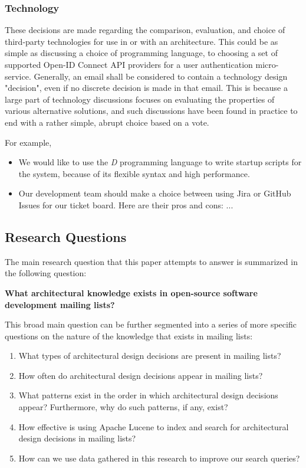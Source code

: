 \documentclass[a4paper, 12pt]{article}
\begin{document}
		\subsubsection{\textbf{Technology}}
			These decisions are made regarding the comparison, evaluation, and choice of third-party technologies for use in or with an architecture. This could be as simple as discussing a choice of programming language, to choosing a set of supported Open-ID Connect API providers for a user authentication micro-service. Generally, an email shall be considered to contain a technology design "decision", even if no discrete decision is made in that email. This is because a large part of technology discussions focuses on evaluating the properties of various alternative solutions, and such discussions have been found in practice to end with a rather simple, abrupt choice based on a vote.
			
			For example,
			\begin{itemize}
				\item We would like to use the \textit{D} programming language to write startup scripts for the system, because of its flexible syntax and high performance\cite{bright}.
				\item Our development team should make a choice between using Jira or GitHub Issues for our ticket board. Here are their pros and cons: ...
			\end{itemize}
		
	\newpage
	\subsection{Research Questions}
		\label{sec:research-questions}
		The main research question that this paper attempts to answer is summarized in the following question:
		
		\large \textbf{What architectural knowledge exists in open-source software development mailing lists?}
		\normalsize
		
		This broad main question can be further segmented into a series of more specific questions on the nature of the knowledge that exists in mailing lists:
		
		\begin{enumerate}
			\item What types of architectural design decisions are present in mailing lists?
			\item How often do architectural design decisions appear in mailing lists?
			\item What patterns exist in the order in which architectural design decisions appear? Furthermore, why do such patterns, if any, exist?
			\item How effective is using Apache Lucene to index and search for architectural design decisions in mailing lists?
			\item How can we use data gathered in this research to improve our search queries?
		\end{enumerate}
	
\end{document}
